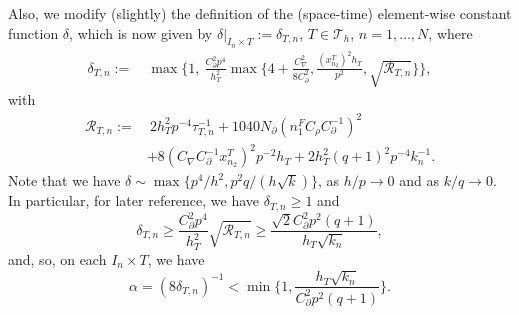 \documentclass{amsart}
\newcommand{\Th}{\mathcal{T}_h}
\newcommand{\cinvT}{C_{\partial}}
\newcommand{\cinv}{C_{\nabla}}
\newcommand{\xn}{x_{n_2}^{T}}
\theoremstyle{definition}
\theoremstyle{remark}
\numberwithin{equation}{section}
\begin{document}
Also, we modify (slightly) the definition of the (space-time) element-wise constant function $\delta$, which is now given by $\delta|_{I_n\times T}:=\delta_{T,n}$, $T\in\Th$, $n=1,\dots, N$, where
\begin{equation}\label{def:deltaFD_def}
	\begin{split} \delta_{T,n}:=&\ \max\bigg\{1,\  \frac{\cinvT^2p^4}{h_T^2}\max\Big\{4+\frac{\cinv^2}{8
			\cinvT^2},\frac{(\xn)^2h_T}{p^2},\sqrt{\mathcal{R}_{T,n}}\Big\}\bigg\},
	\end{split}
\end{equation}
with
\[
\begin{aligned}
\mathcal{R}_{T,n}:=&\ 2h_T^2 p^{-4} \tau_{T,n}^{-1}+1040N_\partial (n_1^FC_\rho\cinvT^{-1})^2\\
&+ 8(\cinv	\cinvT^{-1}\xn)^2p^{-2} h_T+2 h_T^2 (q+1)^2p^{-4} k_n^{-1}.
\end{aligned}
\]
Note that we have
$\delta \sim \max\{ p^4/h^2, p^2q/(h\sqrt{k})\}$,  as $h/p\to 0$ and as $k/q\to 0$. In particular, for later reference, we have $\delta_{T,n}\ge 1$ and
\[
\delta_{T,n}\ge \frac{\cinvT^2p^4}{h_T^2}\sqrt{\mathcal{R}_{T,n}}\ge \frac{\sqrt{2}\cinvT^2p^2(q+1)}{h_T\sqrt{k_n}},
\]
and, so, on each $I_n\times T$, we have
\begin{equation}\label{final_bound_alpha}
\alpha=(8\delta_{T,n})^{-1} <\min\Big\{ 1,  \frac{h_T\sqrt{k_n}}{\cinvT^2p^2(q+1)}\Big\}.
\end{equation}
\end{document}
